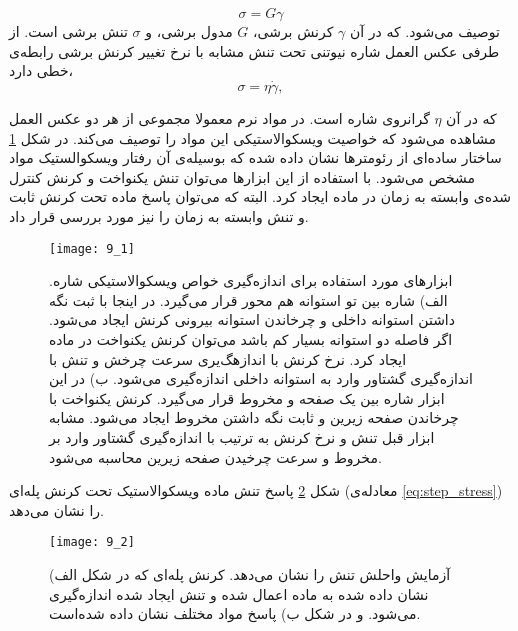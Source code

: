 \begin{equation}
\sigma=G\gamma
\label{eq:elastic}
\end{equation}
توصیف می‌شود. که در آن $\gamma$ کرنش برشی، $G$ مدول برشی، و $\sigma$ تنش برشی است. از طرفی عکس العمل شاره نیوتنی تحت تنش مشابه با نرخ تغییر کرنش برشی رابطه‌ی خطی دارد،
\begin{equation}
\sigma=\eta\dot\gamma,
\label{eq:visco}
\end{equation}

که در آن $\eta$ گرانروی شاره است. در مواد نرم معمولا مجموعی از هر دو عکس العمل مشاهده می‌شود که خواصیت ویسکوالاستیکی این مواد را توصیف می‌کند. در شکل \ref{fig:rheo} ساختار ساده‌ای از رئومترها نشان داده شده که بوسیله‌ی آن رفتار ویسکوالستیک مواد مشخص می‌شود. با استفاده از این ابزارها می‌توان تنش یکنواخت و کرنش کنترل شده‌ی وابسته به زمان در ماده ایجاد کرد. البته که می‌توان پاسخ ماده تحت کرنش ثابت و تنش وابسته به زمان را نیز مورد بررسی قرار داد.
\begin{figure}[htbp]
\begin{center}
\texttt{[image: 9\_1]}
\caption{
ابزارهای مورد استفاده برای اندازه‌گیری خواص ویسکوالاستیکی شاره‌. الف) شاره بین تو استوانه هم محور قرار می‌گیرد. در اینجا با ثبت نگه داشتن استوانه داخلی و چرخاندن استوانه بیرونی کرنش ایجاد می‌شود. اگر فاصله دو استوانه بسیار کم  باشد می‌توان کرنش یکنواخت در ماده ایجاد کرد. نرخ کرنش با اندازهگ‌یری سرعت چرخش و تنش با اندازه‌گیری گشتاور وارد به استوانه داخلی اندازه‌گیری می‌شود. ب) در این ابزار شاره بین یک صفحه و مخروط قرار می‌گیرد. کرنش یکنواخت با چرخاندن صفحه زیرین و ثابت نگه داشتن مخروط ایجاد می‌شود. مشابه ابزار قبل تنش و نرخ کرنش به ترتیب با اندازه‌گیری گشتاور وارد بر مخروط و سرعت چرخیدن صفحه زیرین محاسبه می‌شود.
}
\label{fig:rheo}
\end{center}
\end{figure}
شکل \ref{fig:relax} پاسخ تنش ماده ویسکوالاستیک تحت کرنش پله‌ای (معادله‌ی \ref{eq:step_stress}) را نشان می‌دهد.
\begin{figure}[htbp]
\begin{center}
\texttt{[image: 9\_2]}
\caption{
آزمایش واحلش تنش را نشان می‌دهد. کرنش پله‌ای که در شکل الف) نشان داده شده به ماده اعمال شده و تنش ایجاد شده اندازه‌گیری می‌شود. و در شکل ب) پاسخ مواد مختلف نشان داده ‌شده‌است.
}
\label{fig:relax}
\end{center}
\end{figure}


